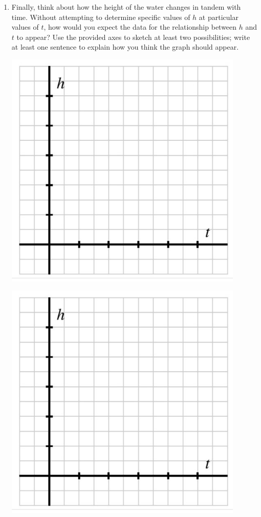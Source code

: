 \documentclass{ximera}
\begin{document}
\begin{exploration}
\begin{enumerate}[label=\alph*.]
\item Finally, think about how the height of the water changes in tandem with time.  Without attempting to determine specific values of \(h\) at particular values of \(t\), how would you expect the data for the relationship between \(h\) and \(t\) to appear?  Use the provided axes to sketch at least two possibilities; write at least one sentence to explain how you think the graph should appear.%


\begin{image}
\includegraphics[width=0.9\textwidth]{CiTtext5.jpg}
\end{image}


\begin{image}
\includegraphics[width=0.9\textwidth]{CiTtext5.jpg}
\end{image}

\end{enumerate}
\end{exploration}
\end{document}
